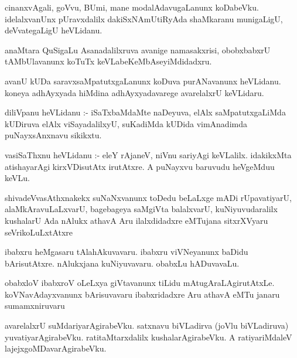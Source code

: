 \documentclass{article}
\begin{document}
\begin{mn}
cinanxvAgali,  goVvu,  BUmi,  mane  modalAdavugaLanunx  koDabeVku.  idelalxvanUnx  pUravxdalilx  
dakiSxNAmUtiRyAda  shaMkaranu  munigaLigU,  deVvategaLigU  heVLidanu.
\end{mn}

\begin{mn}
anaMtara  QuSigaLu  Asanadalilxruva  avanige  namasakxrisi,  obobxbabxrU  tAMbUlavanunx  koTuTx  keVLabeKeMbAseyiMdidadxru.
\end{mn}

\begin{mn}
avanU  kUDa  saravxsaMpatutxgaLanunx  koDuva  purANavanunx  heVLidanu.  koneya  adhAyxyada  hiMdina  
adhAyxyadavarege  avarelalxrU  keVLidaru.
\end{mn}

\begin{mn}
diliVpanu  heVLidanu :- iSaTxbaMdaMte  naDeyuva,  elAlx  saMpatutxgaLiMda  kUDiruva  elAlx  viSayadalilxyU,  
suKadiMda  kUDida  vimAnadimda  puNayxsAnxnavu  sikikxtu.
\end{mn}

\begin{mn}
vasiSaThxnu  heVLidanu :- eleY  rAjaneV,  niVnu  sariyAgi  keVLalilx.  idakikxMta  atishayarAgi  
kirxVDisutAtx  irutAtxre.  A  puNayxvu  baruvudu  heVgeMduu  keVLu.
\end{mn}

\begin{mn}
shivadeVvasAthxnakekx  suNaNxvanunx  toDedu  beLaLxge  mADi  rUpavatiyarU,  alaMkAravuLaLxvarU,  bagebageya  
saMgiVta  balalxvarU,  kuNiyuvudaralilx  kushalarU  Ada  nAlukx  athavA  Aru  ilalxdidadxre  eMTujana  
sitxrXVyaru  seVrikoLuLxtAtxre
\end{mn}

\begin{mn}
ibabxru  heMgasaru  tAlahAkuvavaru.  ibabxru  viVNeyanunx  baDidu  bArisutAtxre.  nAlukxjana  kuNiyuvavaru.  
obabxLu  hADuvavaLu.
\end{mn}

\begin{mn}
obabxloV  ibabxroV  oLeLxya  giVtavanunx  tiLidu  mAtugAraLAgirutAtxLe.  koVNavAdayxvanunx  bArisuvavaru  
ibabxridadxre  Aru  athavA  eMTu  janaru  sumamxniruvaru
\end{mn}

\begin{mn}
avarelalxrU  suMdariyarAgirabeVku.  satxnavu  biVLadirva (joVlu biVLadiruva) yuvatiyarAgirabeVku.  ratitaMtarxdalilx  
kushalarAgirabeVku.  A  ratiyariMdaleV  lajejxgoMDavarAgirabeVku.
\end{mn}
\end{document}
